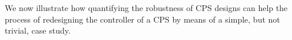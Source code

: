 {{%


%

We now illustrate how quantifying the robustness of CPS designs can help the process of redesigning the controller of a CPS by means of a simple, but not trivial, case study. 

%

%

}}
